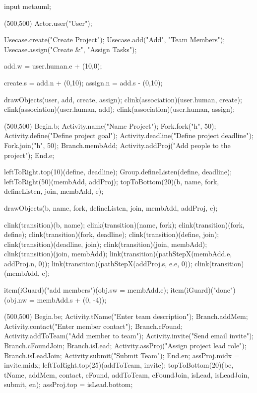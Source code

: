 \begin{empfile}
\begin{empcmds}
input metauml;
\end{empcmds}

\begin{empdef}[usecasediag](500,500)
  Actor.user("User");

  Usecase.create("Create Project");
  Usecase.add("Add", "Team Members");
  Usecase.assign("Create &", "Assign Tasks");

  add.w = user.human.e + (10,0);

  create.s = add.n + (0,10);
  assign.n = add.s - (0,10);
  
  
  drawObjects(user, add, create, assign);
  clink(association)(user.human, create);
  clink(association)(user.human, add);
  clink(association)(user.human, assign);
\end{empdef}

\begin{empdef}[activityR1](500,500)
Begin.b;
Activity.name("Name Project");
Fork.fork("h", 50);
Activity.define("Define project goal");
Activity.deadline("Define project deadline");
Fork.join("h", 50);
Branch.membAdd;
Activity.addProj("Add people to the project");
End.e;

leftToRight.top(10)(define, deadline);
Group.defineListen(define, deadline);
leftToRight(50)(membAdd, addProj);
topToBottom(20)(b, name, fork, defineListen, join, membAdd, e);



drawObjects(b, name, fork, defineListen, join, membAdd, addProj, e);

clink(transition)(b, name);
clink(transition)(name, fork);
clink(transition)(fork, define);
clink(transition)(fork, deadline);
clink(transition)(define, join);
clink(transition)(deadline, join);
clink(transition)(join, membAdd);
clink(transition)(join, membAdd);
link(transition)(pathStepX(membAdd.e, addProj.n, 0));
link(transition)(pathStepX(addProj.s, e.e, 0));
clink(transition)(membAdd, e);

item(iGuard)("add members")(obj.sw = membAdd.e);
item(iGuard)("done")(obj.nw = membAdd.s + (0, -4));
\end{empdef}

\begin{empdef}[activityR2](500,500)
Begin.be;
Activity.tName("Enter team description");
Branch.addMem;
Activity.contact("Enter member contact");
Branch.cFound;
Activity.addToTeam("Add member to team");
Activity.invite("Send email invite");
Branch.cFoundJoin;
Branch.isLead;
Activity.assProj("Assign project lead role");
Branch.isLeadJoin;
Activity.submit("Submit Team");
End.en;
assProj.midx = invite.midx;
leftToRight.top(25)(addToTeam, invite);
topToBottom(20)(be, tName, addMem, contact, cFound, addToTeam, cFoundJoin, isLead, isLeadJoin, submit, en);
assProj.top = isLead.bottom;



\end{empdef}
\end{empfile}

